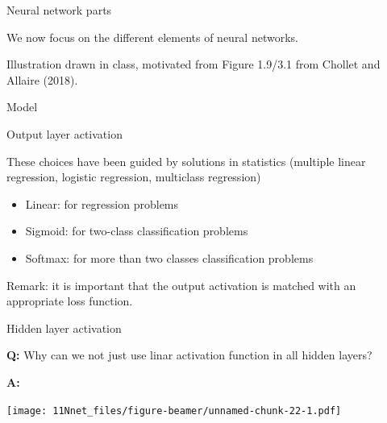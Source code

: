 \documentclass[10pt,ignorenonframetext,]{beamer}
\providecommand{\tightlist}{%
  \setlength{\itemsep}{0pt}\setlength{\parskip}{0pt}}
\begin{document}
\begin{frame}{Neural network parts}
\protect\hypertarget{neural-network-parts}{}

We now focus on the different elements of neural networks.

Illustration drawn in class, motivated from Figure 1.9/3.1 from Chollet
and Allaire (2018).

\end{frame}

\begin{frame}

\begin{block}{Model}

\begin{block}{Output layer activation}

These choices have been guided by solutions in statistics (multiple
linear regression, logistic regression, multiclass regression)

\begin{itemize}
\tightlist
\item
  Linear: for regression problems
\item
  Sigmoid: for two-class classification problems
\item
  Softmax: for more than two classes classification problems
\end{itemize}

Remark: it is important that the output activation is matched with an
appropriate loss function.

\end{block}

\end{block}

\end{frame}

\begin{frame}

\begin{block}{Hidden layer activation}

\textbf{Q:} Why can we not just use linar activation function in all
hidden layers?

\textbf{A:}

\end{block}

\end{frame}

\begin{frame}

\scriptsize

\texttt{[image: 11Nnet\_files/figure-beamer/unnamed-chunk-22-1.pdf]}

\end{frame}
\end{document}
